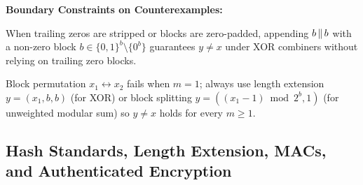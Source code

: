 \textbf{Boundary Constraints on Counterexamples:}
\begin{compactitem}
  \item {} When trailing zeros are stripped or blocks are zero-padded, appending $b \,\|\, b$ with a non-zero block $b \in \{0,1\}^b \setminus \{0^b\}$ guarantees $y \neq x$ under XOR combiners without relying on trailing zero blocks.
  \item {} Block permutation $x_1 \leftrightarrow x_2$ fails when $m=1$; always use length extension $y = (x_1, b, b)$ (for XOR) or block splitting $y = ((x_1 - 1) \bmod 2^b, 1)$ (for unweighted modular sum) so $y \neq x$ holds for every $m \geq 1$.
\end{compactitem}

\subsection{Hash Standards, Length Extension, MACs, and Authenticated Encryption}
